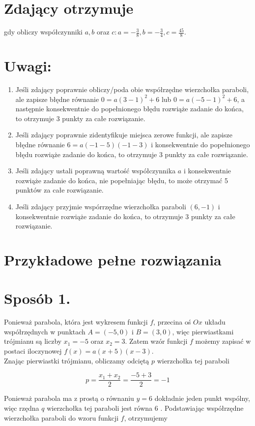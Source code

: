 \documentclass[10pt]{article}
\begin{document}
\section*{Zdający otrzymuje}
gdy obliczy współczynniki $a, b$ oraz $c: a=-\frac{3}{8}, b=-\frac{3}{4}, c=\frac{45}{8}$.

\section*{Uwagi:}
\begin{enumerate}
  \item Jeśli zdający poprawnie obliczy/poda obie współrzędne wierzchołka paraboli, ale zapisze błędne równanie $0=a(3-1)^{2}+6$ lub $0=a(-5-1)^{2}+6$, a następnie konsekwentnie do popełnionego błędu rozwiąże zadanie do końca, to otrzymuje 3 punkty za całe rozwiązanie.
  \item Jeśli zdający poprawnie zidentyfikuje miejsca zerowe funkcji, ale zapisze błędne równanie $6=a(-1-5)(-1-3)$ i konsekwentnie do popełnionego błędu rozwiąże zadanie do końca, to otrzymuje 3 punkty za całe rozwiązanie.
  \item Jeśli zdający ustali poprawną wartość współczynnika $a$ i konsekwentnie rozwiąże zadanie do końca, nie popełniając błędu, to może otrzymać 5 punktów za całe rozwiązanie.
  \item Jeśli zdający przyjmie wspórrzędne wierzchołka paraboli $(6,-1)$ i konsekwentnie rozwiąże zadanie do końca, to otrzymuje 3 punkty za całe rozwiązanie.
\end{enumerate}

\section*{Przykładowe pełne rozwiązania}
\section*{Sposób 1.}
Ponieważ parabola, która jest wykresem funkcji $f$, przecina oś $O x$ układu współrzędnych w punktach $A=(-5,0)$ i $B=(3,0)$, więc pierwiastkami trójmianu są liczby $x_{1}=-5$ oraz $x_{2}=3$. Zatem wzór funkcji $f$ możemy zapisać w postaci iloczynowej $f(x)=a(x+5)(x-3)$.\\
Znając pierwiastki trójmianu, obliczamy odciętą $p$ wierzchołka tej paraboli

$$
p=\frac{x_{1}+x_{2}}{2}=\frac{-5+3}{2}=-1
$$

Ponieważ parabola ma z prostą o równaniu $y=6$ dokładnie jeden punkt wspólny, więc rzędna $q$ wierzchołka tej paraboli jest równa 6 . Podstawiając współrzędne wierzchołka paraboli do wzoru funkcji $f$, otrzymujemy
\end{document}

